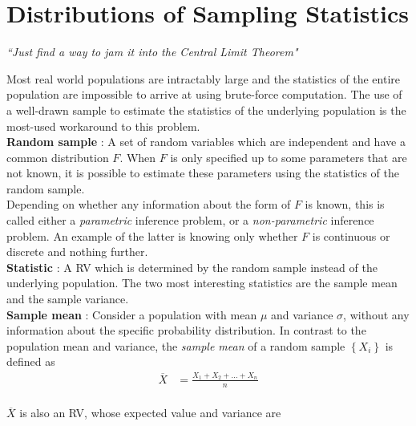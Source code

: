 \chapter{Distributions of Sampling Statistics}


\begin{flushright}
	\textit{``Just find a way to jam it into the Central Limit Theorem"} \\
\end{flushright}

Most real world populations are intractably large and the statistics of the entire population are impossible to arrive at using brute-force computation. The use of a well-drawn sample to estimate the statistics of the underlying population is the most-used workaround to this problem.\\

\textbf{Random sample} : A set of random variables which are independent and have a common distribution $ F $. When $ F $ is only specified up to some parameters that are not known, it is possible to estimate these parameters using the statistics of the random sample.\\

Depending on whether any information about the form of $ F $ is known, this is called either a  \textit{parametric} inference problem, or a \textit{non-parametric} inference problem. An example of the latter is knowing only whether $ F $ is continuous or discrete and nothing further.\\

\textbf{Statistic} : A RV which is determined by the random sample instead of the underlying population. The two most interesting statistics are the sample mean and the sample variance.\\

\textbf{Sample mean} : Consider a population with mean $ \mu $ and variance $ \sigma $, without any information about the specific probability distribution. In contrast to the population mean and variance, the \textit{sample mean} of a random sample $ \left\{X_i\right\} $ is defined as\\

\begin{align}
	\overline{X} &= \frac{X_1 + X_2 + \dots + X_n}{n}
\end{align}\\

$ \overline{X} $ is also an RV, whose expected value and variance are\\

